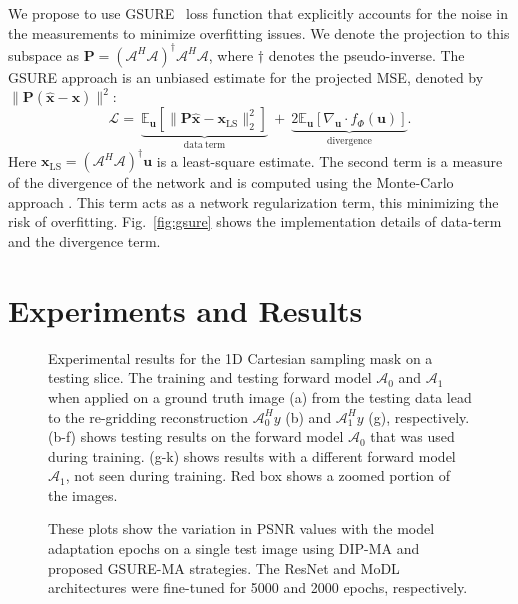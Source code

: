 \documentclass{article}
\newcommand{\bs}{\boldsymbol}
\newcommand{\mbf}{\mathbf}
\begin{document}
We propose to use GSURE~\cite{eldarGSURE} loss function that explicitly accounts for the noise in the measurements to minimize overfitting issues. We denote the projection to this subspace as $\mbf P = (\mathcal A^H \mathcal A)^{\dag}\mathcal A^H\mathcal A$, where $\dag$ denotes the pseudo-inverse. The GSURE approach is an unbiased estimate for the projected MSE, denoted by $\|\mathbf P(\bs{\widehat x} - \bs x)\|^2$: 
\begin{equation} \label{gsure}
	\mathcal L =~ \underbrace{\mathbb E_{\bs u} \left [ \|\mbf P \bs{\widehat x} -\bs x_{\text{LS}}  \|_2^2 \right]} _{\mathrm{data~ term}} ~+
	 ~\underbrace{2 \mathbb E_{\bs{u}} \left [\nabla_{\bs{u}} \cdot  f_\Phi(\bs{u})  \right ]}_ {\mathrm{divergence}}. 
\end{equation}
Here $\bs x_{\text{LS}}=(\mathcal A^H \mathcal A)^{\dag} \bs u$ is a least-square estimate. The second term is a measure of the divergence of the network and is computed using the Monte-Carlo approach \cite{mcsure}. This term acts as a network regularization term, this minimizing the risk of overfitting. Fig.~\ref{fig:gsure} shows the implementation details of data-term and the divergence term. 



\section{Experiments and Results}
\begin{figure*}
	
	\caption{Experimental results for the 1D Cartesian sampling mask on a testing slice. The training and testing forward model $\mathcal A_0$ and $\mathcal A_1$ when applied on a ground truth image (a) from the testing data lead to the re-gridding reconstruction $\mathcal A_0^Hy$ (b) and $\mathcal A_1^Hy$ (g), respectively.  (b-f) shows testing results on the forward model $\mathcal A_0$ that was used during training. (g-k) shows results with a different forward model $\mathcal A_1$, not seen during training. Red box shows a zoomed portion of the images. }
	\label{fig:results1d}
\end{figure*}
\begin{figure*} 
	\centering
	\caption{\footnotesize{These plots show the variation in PSNR values with the model adaptation epochs on a single test image using DIP-MA and proposed GSURE-MA strategies. The ResNet and MoDL architectures were fine-tuned for 5000 and 2000 epochs, respectively.}}
	\label{fig:plots}
\end{figure*}
\end{document}
